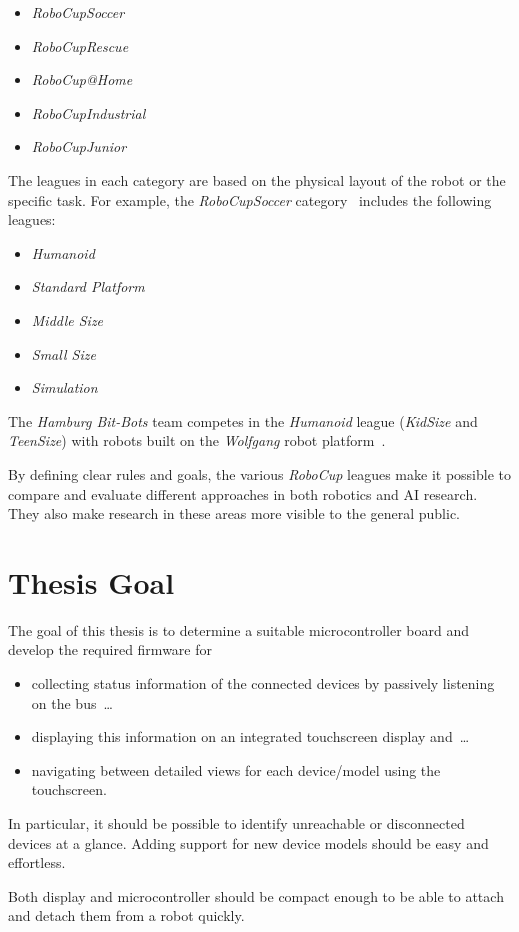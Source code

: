 \begin{itemize}
    \item \textit{RoboCupSoccer}
    \item \textit{RoboCupRescue}
    \item \textit{RoboCup@Home}
    \item \textit{RoboCupIndustrial}
    \item \textit{RoboCupJunior}
\end{itemize}

The leagues in each category are based on the physical layout of the robot or the specific task. For
example, the \textit{RoboCupSoccer} category~\cite{robocup-soccer} includes the following leagues:

\begin{itemize}
    \item \textit{Humanoid}
    \item \textit{Standard Platform}
    \item \textit{Middle Size}
    \item \textit{Small Size}
    \item \textit{Simulation}
\end{itemize}

The \textit{Hamburg Bit-Bots} team competes in the \textit{Humanoid} league (\textit{KidSize} and
\textit{TeenSize}) with robots built on the \textit{Wolfgang} robot platform~\cite{robocup-humanoid-teams}.

By defining clear rules and goals, the various \textit{RoboCup} leagues make it possible to compare
and evaluate different approaches in both robotics and AI research. They also make research in these
areas more visible to the general public.

\section{Thesis Goal}
\label{introduction/thesis-goal}

The goal of this thesis is to determine a suitable microcontroller board and develop
the required firmware for

\begin{itemize}
    \item collecting status information of the connected devices by passively listening on the bus~\dots
    \item displaying this information on an integrated touchscreen display and~\dots
    \item navigating between detailed views for each device/model using the touchscreen.
\end{itemize}

In particular, it should be possible to identify unreachable or disconnected devices at a glance.
Adding support for new device models should be easy and effortless.

Both display and microcontroller should be compact enough to be able to attach and detach them
from a robot quickly.
